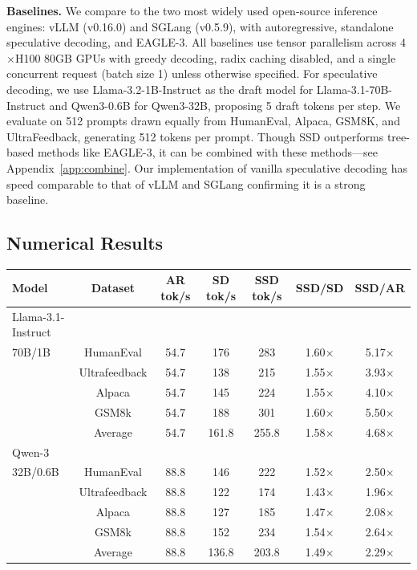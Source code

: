 \textbf{Baselines.} We compare to the two most widely used open-source  
  inference engines: vLLM (v0.16.0) and SGLang (v0.5.9), with
  autoregressive, standalone speculative decoding, and EAGLE-3. All baselines use tensor parallelism across 4$\times$H100 80GB GPUs with greedy decoding, radix caching disabled, and a single concurrent request (batch size 1) unless otherwise specified. For speculative
   decoding, we use Llama-3.2-1B-Instruct as the draft model for
  Llama-3.1-70B-Instruct and Qwen3-0.6B for Qwen3-32B, proposing 5 draft
  tokens per step. We evaluate on 512 prompts drawn equally from
  HumanEval, Alpaca, GSM8K, and UltraFeedback, generating 512 tokens per prompt. Though SSD outperforms tree-based methods like EAGLE-3, it can be combined with these methods---see Appendix~\ref{app:combine}. Our implementation of vanilla speculative decoding has speed comparable to that of vLLM and SGLang confirming it is a strong baseline.

\subsection{Numerical Results}

\begin{table}[h]
\centering
\small
\setlength{\tabcolsep}{4pt}
\begin{tabular}{lcccccc}
\hline
\textbf{Model} & \textbf{Dataset} & \textbf{AR tok/s} & \textbf{SD tok/s} & \textbf{SSD tok/s} & \textbf{SSD/SD} & \textbf{SSD/AR} \\
\hline
Llama-3.1-Instruct \\ 70B/1B & HumanEval & 54.7 & 176 & 283 & 1.60$\times$ & 5.17$\times$ \\
 & Ultrafeedback & 54.7 & 138 & 215 & 1.55$\times$ & 3.93$\times$ \\
 & Alpaca & 54.7 & 145 & 224 & 1.55$\times$ & 4.10$\times$ \\
 & GSM8k & 54.7 & 188 & 301 & 1.60$\times$ & 5.50$\times$ \\
 & Average & 54.7 & 161.8 & 255.8 & 1.58$\times$ & 4.68$\times$ \\
\hline
Qwen-3 \\ 32B/0.6B & HumanEval & 88.8 & 146 & 222 & 1.52$\times$ & 2.50$\times$ \\
 & Ultrafeedback & 88.8 & 122 & 174 & 1.43$\times$ & 1.96$\times$ \\
 & Alpaca & 88.8 & 127 & 185 & 1.47$\times$ & 2.08$\times$ \\
 & GSM8k & 88.8 & 152 & 234 & 1.54$\times$ & 2.64$\times$ \\
 & Average & 88.8 & 136.8 & 203.8 & 1.49$\times$ & 2.29$\times$ \\
\hline
\end{tabular}
\label{tab:throughput_results}
\end{table}



